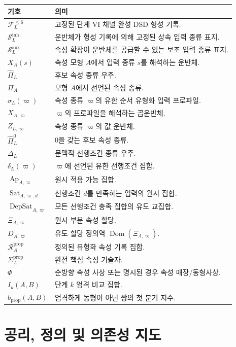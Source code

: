 \documentclass[11pt]{article}
\newcommand{\FVI}{\mathcal F_{L}^{\le 6}}
\newcommand{\Sin}{\mathcal S_{L}^{\mathrm{inh}}}
\newcommand{\Saux}{\mathcal S_{L}^{\mathrm{aux}}}
\newcommand{\Pihat}{\widehat{\Pi}_{L}}
\newcommand{\PiZero}{\widehat{\Pi}_{L}^{0}}
\newcommand{\Dep}{\Delta_{L}}
\newcommand{\Ap}{\operatorname{Ap}}
\newcommand{\DepSat}{\operatorname{DepSat}}
\newcommand{\Sat}{\operatorname{Sat}}
\newcommand{\Dom}{\operatorname{Dom}}
\newcommand{\PropRec}{\mathcal R^{\mathrm{prop}}}
\theoremstyle{definition}
\theoremstyle{remark}
\begin{document}
\begin{tabularx}{\textwidth}{@{}>{\raggedright\arraybackslash}p{}X@{}}
\toprule
기호 & 의미\\
\midrule
\(\FVI\) & 고정된 단계 VI 채널 완성 DSD 형성 기록.\\
\(\Sin\) & 운반체가 형성 기록에 의해 고정된 상속 입력 종류 표지.\\
\(\Saux\) & 속성 확장이 운반체를 공급할 수 있는 보조 입력 종류 표지.\\
\(X_A(s)\) & 속성 모형 \(A\)에서 입력 종류 \(s\)를 해석하는 운반체.\\
\(\Pihat\) & 후보 속성 종류 우주.\\
\(\Pi_A\) & 모형 \(A\)에서 선언된 속성 종류.\\
\(\sigma_L(\varpi)\) & 속성 종류 \(\varpi\)의 유한 순서 유형화 입력 프로파일.\\
\(X_{A,\varpi}\) & \(\varpi\)의 프로파일을 해석하는 곱운반체.\\
\(Z_{L,\varpi}\) & 속성 종류 \(\varpi\)의 값 운반체.\\
\(\PiZero\) & 0을 갖는 후보 속성 종류.\\
\(\Dep\) & 문맥적 선행조건 종류 우주.\\
\(\delta_L(\varpi)\) & \(\varpi\)에 선언된 유한 선행조건 집합.\\
\(\Ap_{A,\varpi}\) & 원시 적용 가능 집합.\\
\(\Sat_{A,\varpi,d}\) & 선행조건 \(d\)를 만족하는 입력의 원시 집합.\\
\(\DepSat_{A,\varpi}\) & 모든 선행조건 충족 집합의 유도 교집합.\\
\(\Xi_{A,\varpi}\) & 원시 부분 속성 할당.\\
\(D_{A,\varpi}\) & 유도 할당 정의역 \(\Dom(\Xi_{A,\varpi})\).\\
\(\PropRec_A\) & 정의된 유형화 속성 기록 집합.\\
\(\Sigma_A^{\mathrm{prop}}\) & 완전 핵심 속성 기술자.\\
\(\Phi\) & 순방향 속성 사상 또는 명시된 경우 속성 매장/동형사상.\\
\(I_k(A,B)\) & 단계 \(k\) 엄격 비교 집합.\\
\(b_{\mathrm{prop}}(A,B)\) & 엄격하게 동형이 아닌 쌍의 첫 분기 지수.\\
\bottomrule
\end{tabularx}

\section{공리, 정의 및 의존성 지도}
\label{app:dependency-map}
\end{document}
